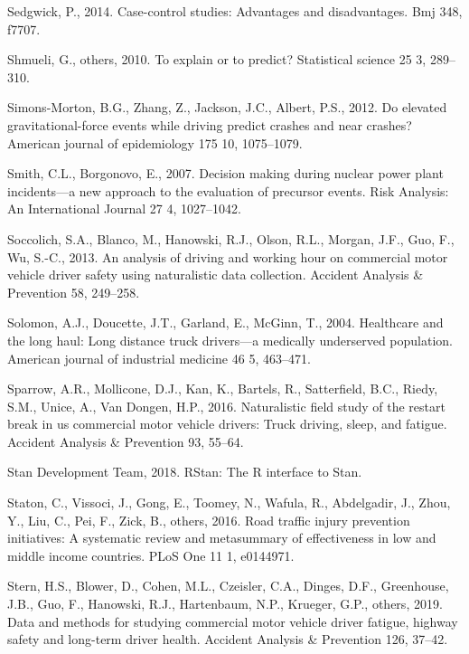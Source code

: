 \documentclass[12pt]{book}
\numberwithin{equation}{chapter}
\begin{document}
\leavevmode\hypertarget{ref-sedgwick2014case}{}%
Sedgwick, P., 2014. Case-control studies: Advantages and disadvantages. Bmj 348, f7707.

\leavevmode\hypertarget{ref-shmueli2010explain}{}%
Shmueli, G., others, 2010. To explain or to predict? Statistical science 25 3, 289--310.

\leavevmode\hypertarget{ref-simons2012elevated}{}%
Simons-Morton, B.G., Zhang, Z., Jackson, J.C., Albert, P.S., 2012. Do elevated gravitational-force events while driving predict crashes and near crashes? American journal of epidemiology 175 10, 1075--1079.

\leavevmode\hypertarget{ref-smith2007decision}{}%
Smith, C.L., Borgonovo, E., 2007. Decision making during nuclear power plant incidents---a new approach to the evaluation of precursor events. Risk Analysis: An International Journal 27 4, 1027--1042.

\leavevmode\hypertarget{ref-soccolich2013analysis}{}%
Soccolich, S.A., Blanco, M., Hanowski, R.J., Olson, R.L., Morgan, J.F., Guo, F., Wu, S.-C., 2013. An analysis of driving and working hour on commercial motor vehicle driver safety using naturalistic data collection. Accident Analysis \& Prevention 58, 249--258.

\leavevmode\hypertarget{ref-solomon2004healthcare}{}%
Solomon, A.J., Doucette, J.T., Garland, E., McGinn, T., 2004. Healthcare and the long haul: Long distance truck drivers---a medically underserved population. American journal of industrial medicine 46 5, 463--471.

\leavevmode\hypertarget{ref-sparrow2016naturalistic}{}%
Sparrow, A.R., Mollicone, D.J., Kan, K., Bartels, R., Satterfield, B.C., Riedy, S.M., Unice, A., Van Dongen, H.P., 2016. Naturalistic field study of the restart break in us commercial motor vehicle drivers: Truck driving, sleep, and fatigue. Accident Analysis \& Prevention 93, 55--64.

\leavevmode\hypertarget{ref-rstancitation}{}%
Stan Development Team, 2018. RStan: The R interface to Stan.

\leavevmode\hypertarget{ref-staton2016road}{}%
Staton, C., Vissoci, J., Gong, E., Toomey, N., Wafula, R., Abdelgadir, J., Zhou, Y., Liu, C., Pei, F., Zick, B., others, 2016. Road traffic injury prevention initiatives: A systematic review and metasummary of effectiveness in low and middle income countries. PLoS One 11 1, e0144971.

\leavevmode\hypertarget{ref-stern2019data}{}%
Stern, H.S., Blower, D., Cohen, M.L., Czeisler, C.A., Dinges, D.F., Greenhouse, J.B., Guo, F., Hanowski, R.J., Hartenbaum, N.P., Krueger, G.P., others, 2019. Data and methods for studying commercial motor vehicle driver fatigue, highway safety and long-term driver health. Accident Analysis \& Prevention 126, 37--42.
\end{document}
